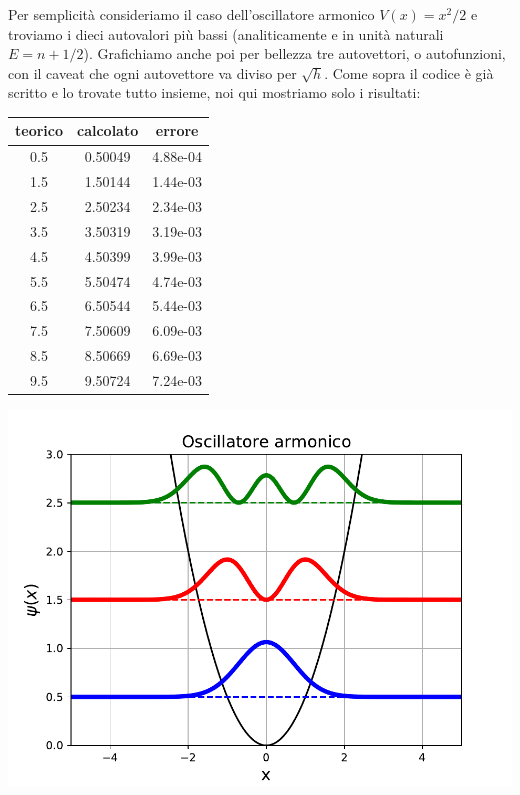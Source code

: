 \documentclass[10pt,a4paper]{article}
\begin{document}
Per semplicità consideriamo il caso dell'oscillatore armonico $V(x) = x^2/2$ e troviamo i dieci autovalori più bassi (analiticamente e in unità naturali $E=n+1/2$). Grafichiamo anche poi per bellezza tre autovettori, o autofunzioni, con il caveat che ogni autovettore va diviso per $\sqrt{h}$. Come sopra il codice è già scritto e lo trovate tutto insieme, noi qui mostriamo solo i risultati:
\begin{center}
\begin{tabular}{ccc}
  \hline
  teorico &calcolato&errore \\
  \hline 
  0.5 & 0.50049 & 4.88e-04 \\ 
   
  1.5 & 1.50144 & 1.44e-03 \\ 
 
  2.5 & 2.50234 & 2.34e-03 \\ 
  
  3.5 & 3.50319 & 3.19e-03 \\ 
  
  4.5 & 4.50399 & 3.99e-03 \\ 
  
  5.5 & 5.50474 & 4.74e-03 \\ 

  6.5 & 6.50544 & 5.44e-03 \\ 

  7.5 & 7.50609 & 6.09e-03 \\ 

  8.5 & 8.50669 & 6.69e-03 \\ 

  9.5 & 9.50724 & 7.24e-03 \\ 
  \hline 
\end{tabular}   
\end{center}

\begin{center}
\includegraphics[scale=0.9]{img/mq.pdf}	 
\end{center}
\end{document}
